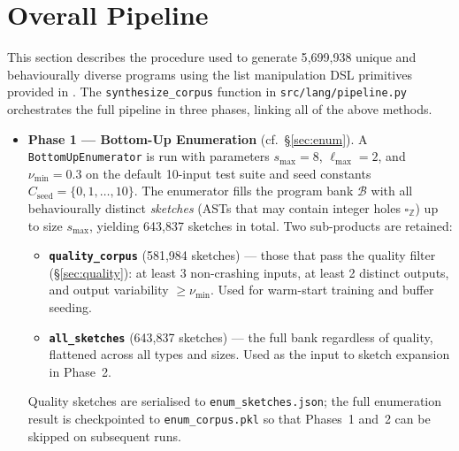 \documentclass[11pt,a4paper]{article}
\begin{document}
\section{Overall Pipeline}\label{sec:pipeline}

This section describes the procedure used to generate 5{,}699{,}938 unique and behaviourally diverse programs using the list manipulation DSL primitives provided in \citet{rule2024symbolic}. The \texttt{synthesize\_corpus} function in \texttt{src/lang/pipeline.py} orchestrates the full pipeline in three phases, linking all of the above methods.

\begin{itemize}

  \item \textbf{Phase 1 --- Bottom-Up Enumeration}
    (cf.~\S\ref{sec:enum}).
    A \texttt{BottomUpEnumerator} is run with parameters $s_{\max} = 8$,
    $\ell_{\max} = 2$, and $\nu_{\min} = 0.3$ on the default 10-input test suite
    and seed constants $C_{\mathrm{seed}} = \{0, 1, \ldots, 10\}$.
    The enumerator fills the program bank $\mathcal{B}$ with all
    behaviourally distinct \emph{sketches} (ASTs that may contain integer
    holes $\square_{\mathbb{Z}}$) up to size $s_{\max}$, yielding
    643{,}837 sketches in total.
    Two sub-products are retained:
    \begin{itemize}
      \item \textbf{\texttt{quality\_corpus}} (581{,}984 sketches) --- those
            that pass the quality filter (\S\ref{sec:quality}): at least 3
            non-crashing inputs, at least 2 distinct outputs, and output
            variability $\geq \nu_{\min}$.  Used for warm-start training and
            buffer seeding.
      \item \textbf{\texttt{all\_sketches}} (643{,}837 sketches) --- the full
            bank regardless of quality, flattened across all types and sizes.
            Used as the input to sketch expansion in Phase~2.
    \end{itemize}
    Quality sketches are serialised to \texttt{enum\_sketches.json}; the full
    enumeration result is checkpointed to \texttt{enum\_corpus.pkl} so that
    Phases~1 and~2 can be skipped on subsequent runs.


\end{itemize}
\end{document}
